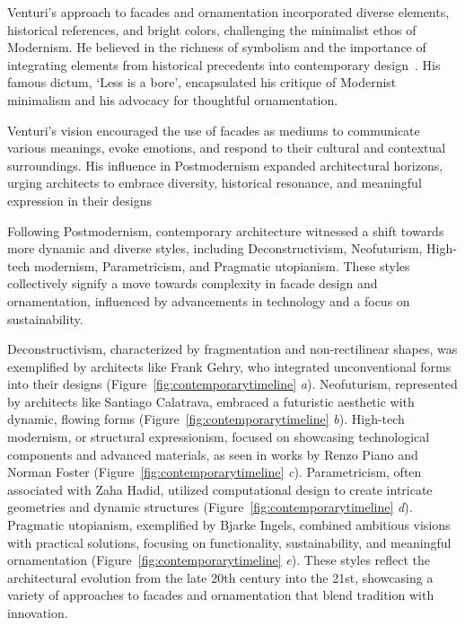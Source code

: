 Venturi's approach to facades and ornamentation incorporated diverse elements, historical references, and bright colors, challenging the minimalist ethos of Modernism.
He believed in the richness of symbolism and the importance of integrating elements from historical precedents into contemporary design~\cite{Venturi1971}.
His famous dictum, `Less is a bore', encapsulated his critique of Modernist minimalism and his advocacy for thoughtful ornamentation.

Venturi's vision encouraged the use of facades as mediums to communicate various meanings, evoke emotions, and respond to their cultural and contextual surroundings.
His influence in Postmodernism expanded architectural horizons, urging architects to embrace diversity, historical resonance, and meaningful expression in their designs~\cite{Lutolli2020, Stamp2016}


Following Postmodernism, contemporary architecture witnessed a shift towards more dynamic and diverse styles, including Deconstructivism, Neofuturism, High-tech modernism, Parametricism, and Pragmatic utopianism.
These styles collectively signify a move towards complexity in facade design and ornamentation, influenced by advancements in technology and a focus on sustainability.

Deconstructivism, characterized by fragmentation and non-rectilinear shapes, was exemplified by architects like Frank Gehry, who integrated unconventional forms into their designs (Figure~\ref{fig:contemporarytimeline} \textit{a}).
Neofuturism, represented by architects like Santiago Calatrava, embraced a futuristic aesthetic with dynamic, flowing forms (Figure~\ref{fig:contemporarytimeline} \textit{b}).
High-tech modernism, or structural expressionism, focused on showcasing technological components and advanced materials, as seen in works by Renzo Piano and Norman Foster (Figure~\ref{fig:contemporarytimeline} \textit{c}).
Parametricism, often associated with Zaha Hadid, utilized computational design to create intricate geometries and dynamic structures (Figure~\ref{fig:contemporarytimeline} \textit{d}).
Pragmatic utopianism, exemplified by Bjarke Ingels, combined ambitious visions with practical solutions, focusing on functionality, sustainability, and meaningful ornamentation (Figure~\ref{fig:contemporarytimeline} \textit{e}).
These styles reflect the architectural evolution from the late 20th century into the 21st, showcasing a variety of approaches to facades and ornamentation that blend tradition with innovation.


